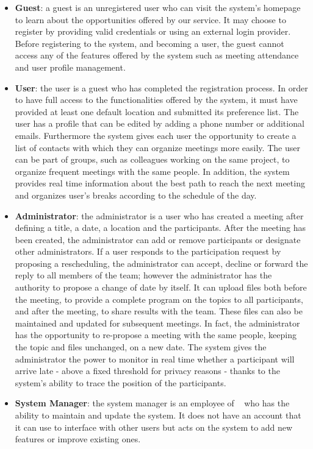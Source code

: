 \begin{itemize}
	\item \textbf{{\large Guest}}: a guest is an unregistered user who can visit the system's homepage to learn about the opportunities offered by our service. It may choose to register by providing valid credentials or using an external login provider. Before registering to the system, and becoming a user, the guest cannot access any of the features offered by the system such as meeting attendance and user profile management.
	\item \textbf{{\large User}}: the user is a guest who has completed the registration process. In order to have full access to the functionalities offered by the system, it must have provided at least one default location and submitted its preference list. The user has a profile that can be edited by adding a phone number or additional emails. Furthermore the system gives each user the opportunity to create a list of contacts with which they can organize meetings more easily. The user can be part of groups, such as colleagues working on the same project, to organize frequent meetings with the same people. In addition, the system provides real time information about the best path to reach the next meeting and organizes user's breaks according to the schedule of the day.
	\item \textbf{{\large Administrator}}: the administrator is a user who has created a meeting after defining a title, a date, a location and the participants.  After the meeting has been created, the administrator can add or remove participants or designate other administrators. If a user responds to the participation request by proposing a rescheduling, the administrator can accept, decline or forward the reply to all members of the team; however the administrator has the authority to propose a change of date by itself. \newline
	It can upload files both before the meeting, to provide a complete program on the topics to all participants, and after the meeting, to share results with the team. These files can also be maintained and updated for subsequent meetings. In fact, the administrator has the opportunity to re-propose a meeting with the same people, keeping the topic and files unchanged, on a new date. \newline
	The system gives the administrator the power to monitor in real time whether a participant will arrive late - above a fixed threshold for privacy reasons - thanks to the system's ability to trace the position of the participants.
	\item \textbf{{\large System Manager}}: the system manager is an employee of \projectname~  who has the ability to maintain and update the system. It does not have an account that it can use to interface with other users but acts on the system to add new features or improve existing ones.
\end{itemize}
